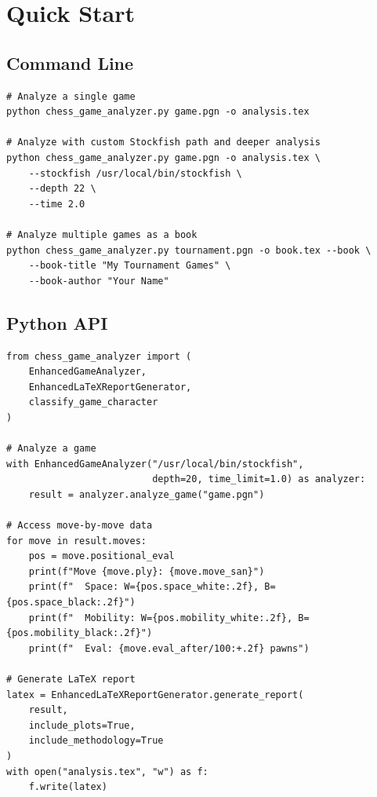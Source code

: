 \documentclass[12pt]{book}
\begin{document}
\section{Quick Start}

\subsection{Command Line}

\begin{verbatim}
# Analyze a single game
python chess_game_analyzer.py game.pgn -o analysis.tex

# Analyze with custom Stockfish path and deeper analysis
python chess_game_analyzer.py game.pgn -o analysis.tex \
    --stockfish /usr/local/bin/stockfish \
    --depth 22 \
    --time 2.0

# Analyze multiple games as a book
python chess_game_analyzer.py tournament.pgn -o book.tex --book \
    --book-title "My Tournament Games" \
    --book-author "Your Name"
\end{verbatim}

\subsection{Python API}

\begin{verbatim}
from chess_game_analyzer import (
    EnhancedGameAnalyzer,
    EnhancedLaTeXReportGenerator,
    classify_game_character
)

# Analyze a game
with EnhancedGameAnalyzer("/usr/local/bin/stockfish", 
                          depth=20, time_limit=1.0) as analyzer:
    result = analyzer.analyze_game("game.pgn")

# Access move-by-move data
for move in result.moves:
    pos = move.positional_eval
    print(f"Move {move.ply}: {move.move_san}")
    print(f"  Space: W={pos.space_white:.2f}, B={pos.space_black:.2f}")
    print(f"  Mobility: W={pos.mobility_white:.2f}, B={pos.mobility_black:.2f}")
    print(f"  Eval: {move.eval_after/100:+.2f} pawns")

# Generate LaTeX report
latex = EnhancedLaTeXReportGenerator.generate_report(
    result,
    include_plots=True,
    include_methodology=True
)
with open("analysis.tex", "w") as f:
    f.write(latex)
\end{verbatim}
\end{document}
